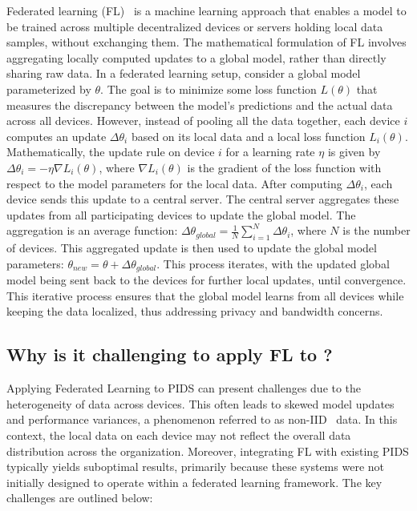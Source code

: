  Federated learning (FL)~\cite{mcmahan2017communication} is a machine learning approach that enables a model to be trained across multiple decentralized devices or servers holding local data samples, without exchanging them. The mathematical formulation of FL involves aggregating locally computed updates to a global model, rather than directly sharing raw data. In a federated learning setup, consider a global model parameterized by \(\theta\). The goal is to minimize some loss function \(L(\theta)\) that measures the discrepancy between the model's predictions and the actual data across all devices. However, instead of pooling all the data together, each device \(i\) computes an update \(\Delta \theta_i\) based on its local data and a local loss function \(L_i(\theta)\). Mathematically, the update rule on device \(i\) for a learning rate \(\eta\) is given by \(\Delta \theta_i = -\eta \nabla L_i(\theta)\), where \(\nabla L_i(\theta)\) is the gradient of the loss function with respect to the model parameters for the local data. After computing \(\Delta \theta_i\), each device sends this update to a central server. The central server aggregates these updates from all participating devices to update the global model. The aggregation is an average function: \(\Delta \theta_{global} = \frac{1}{N} \sum_{i=1}^{N} \Delta \theta_i\), where \(N\) is the number of devices. This aggregated update is then used to update the global model parameters: \(\theta_{new} = \theta + \Delta \theta_{global}\). This process iterates, with the updated global model being sent back to the devices for further local updates, until convergence. This iterative process ensures that the global model learns from all devices while keeping the data localized, thus addressing privacy and bandwidth concerns.


\subsection{Why is it challenging to apply FL to \pids?}

Applying Federated Learning to PIDS can present challenges due to the heterogeneity of data across devices. This often leads to skewed model updates and performance variances, a phenomenon referred to as non-IID~\cite{zhao2018federated} data. In this context, the local data on each device may not reflect the overall data distribution across the organization. Moreover, integrating FL with existing PIDS typically yields suboptimal results, primarily because these systems were not initially designed to operate within a federated learning framework. The key challenges are outlined below:


